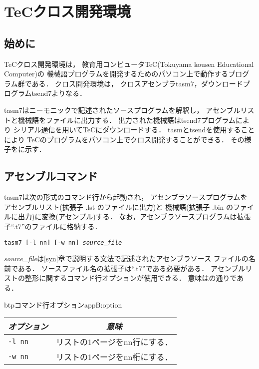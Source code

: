 \renewcommand{\myincludegraphics}[2]{\texttt{[image: appB/\#1]}}

\newpage
\chapter{TeCクロス開発環境}
\label{cross}
\section{始めに}
TeCクロス開発環境は，
教育用コンピュータTeC(Tokuyama kousen Educational Computer)の
機械語プログラムを開発するためのパソコン上で動作するプログラム群である．
クロス開発環境は，
クロスアセンブラtasm7，ダウンロードプログラムtsend7よりなる．

tasm7はニーモニックで記述されたソースプログラムを解釈し，
アセンブルリストと機械語をファイルに出力する．
出力された機械語はtsend7プログラムにより
シリアル通信を用いてTeCにダウンロードする．
tasmとtsendを使用することにより
TeCのプログラムをパソコン上でクロス開発することができる．
その様子をに示す．


\section{アセンブルコマンド}
tasm7は次の形式のコマンド行から起動され，
アセンブラソースプログラムを
アセンブルリスト(拡張子 .lst のファイルに出力)と
機械語(拡張子 .bin のファイルに出力)に変換(アセンブル)する．
なお，アセンブラソースプログラムは拡張子``.t7''のファイルに格納する．

\begin{center}
{\small\tt tasm7 [-l nn] [-w nn] {\it source\_file} }
\end{center}

{\it source\_file}は\ref{syn}章で説明する文法で記述されたアセンブラソース
ファイルの名前である．
ソースファイル名の拡張子は``.t7''である必要がある．
アセンブルリストの整形に関するコマンド行オプションが使用できる．
意味はの通りである．

\begin{mytable}{btp}{コマンド行オプション}{appB:option}
{\small\begin{tabular}{l | l} \hline\hline
\multicolumn{1}{c|}{\it オプション} & \multicolumn{1}{c}{\it 意味} \\ \hline
{\tt -l nn}  &  リストの1ページをnn行にする． \\
{\tt -w nn}  &  リストの1ページをnn桁にする．
\end{tabular}}
\end{mytable}

